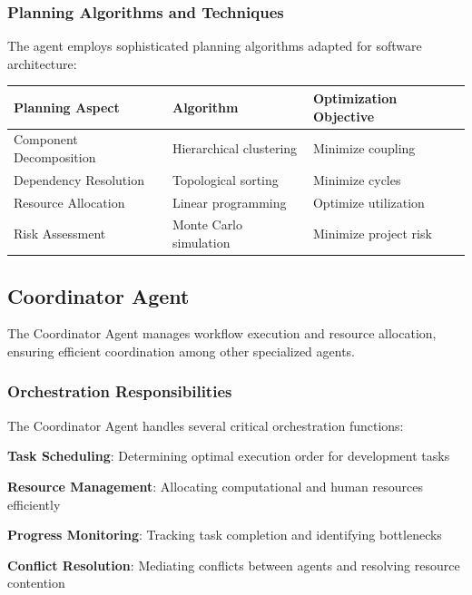 \subsubsection*{Planning Algorithms and Techniques}

The agent employs sophisticated planning algorithms adapted for software architecture:

\begin{center}
\begin{tabular}{@{}lll@{}}
\toprule
\textbf{Planning Aspect} & \textbf{Algorithm} & \textbf{Optimization Objective} \\
\midrule
Component Decomposition & Hierarchical clustering & Minimize coupling \\
Dependency Resolution & Topological sorting & Minimize cycles \\
Resource Allocation & Linear programming & Optimize utilization \\
Risk Assessment & Monte Carlo simulation & Minimize project risk \\
\bottomrule
\end{tabular}
\end{center}

\subsection*{Coordinator Agent}

The Coordinator Agent manages workflow execution and resource allocation, ensuring efficient coordination among other specialized agents.

\subsubsection*{Orchestration Responsibilities}

The Coordinator Agent handles several critical orchestration functions:

\begin{expandedlist}
    \item \textbf{Task Scheduling}: Determining optimal execution order for development tasks
    \item \textbf{Resource Management}: Allocating computational and human resources efficiently
    \item \textbf{Progress Monitoring}: Tracking task completion and identifying bottlenecks
    \item \textbf{Conflict Resolution}: Mediating conflicts between agents and resolving resource contention
\end{expandedlist}

